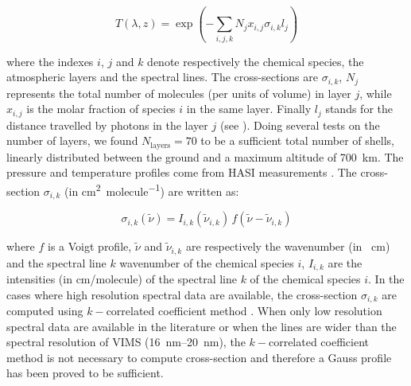 \documentclass{arxiv-icarus}
\begin{document}
\begin{equation}\label{eq:transmit}
    T(\lambda,z) = \exp \left( -\sum_{i, j, k} N_j x_{i,j} \sigma_{i,k} l_j \right)
\end{equation}

where the indexes $i$, $j$ and $k$ denote respectively the chemical species, the atmospheric layers and the spectral lines.
The cross-sections are  $\sigma_{i,k}$, $N_j$ represents the total number of molecules (per units of volume) in layer $j$, while $x_{i,j}$ is the molar fraction of species $i$ in the same layer.
Finally $l_j$ stands for the distance travelled by photons in the layer $j$ (see ).
Doing several tests on the number of layers, we found $N_\text{layers} = 70$ to be a sufficient total number of shells, linearly distributed between the ground and a maximum altitude of \SI{700}{km}.
The pressure and temperature profiles come from HASI measurements \citep{Fulchignoni2005}.
The cross-section $\sigma_{i,k}$ (in \si{cm\squared\per molecule}) are written as:

\begin{equation}\label{eq:I_F}
    \sigma_{i,k} (\tilde{\nu}) = I_{i,k}(\tilde{\nu}_{i,k}) \, f(\tilde{\nu}-\tilde{\nu}_{i,k})
\end{equation}

where $f$ is a Voigt profile, $\tilde{\nu}$ and $\tilde{\nu}_{i,k}$ are respectively the wavenumber (in \si{\per\cm}) and the spectral line $k$ wavenumber of the chemical species $i$, $I_{i,k}$ are the intensities (in cm/molecule) of the spectral line $k$ of the chemical species $i$.
In the cases where high resolution spectral data are available, the cross-section $\sigma_{i,k}$ are computed using $k-$correlated coefficient method \citep{Arking1972,Chou1980,Fu1992}.
When only low resolution spectral data are available in the literature or when the lines are wider than the spectral resolution of VIMS (\SIrange{16}{20}{nm}), the $k-$correlated coefficient method is not necessary to compute cross-section and therefore a Gauss profile has been proved to be sufficient.
\end{document}
